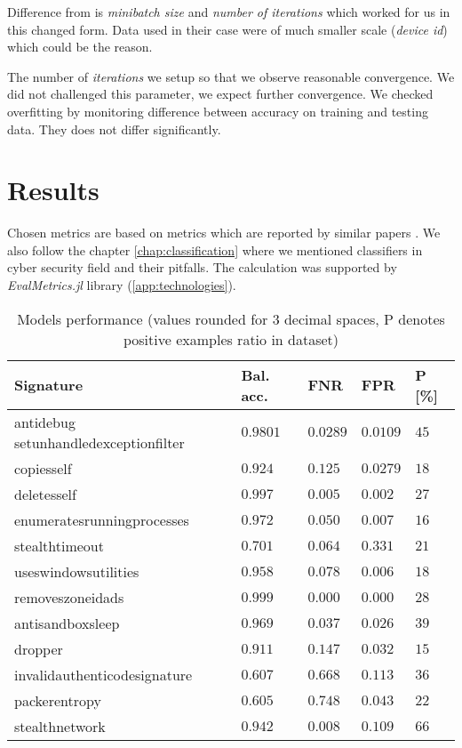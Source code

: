 Difference from \cite{Mandlik2020} is \emph{minibatch size} and \emph{number of iterations} which worked for us in this changed form. Data used in their case were of much smaller scale (\emph{device id}) which could be the reason.

The number of \emph{iterations} we setup so that we observe reasonable convergence. We did not challenged this parameter, we expect further convergence. We checked overfitting by monitoring difference between accuracy on training and testing data. They does not differ significantly.

\section{Results}
Chosen metrics are based on metrics which are reported by similar papers . We also follow the chapter \ref{chap:classification} where we mentioned classifiers in cyber security field and their pitfalls. The calculation was supported by \emph{EvalMetrics.jl} library (\ref{app:technologies}).

\begin{table}[h]
  \centering
  \caption{Models performance (values rounded for 3 decimal spaces, P denotes positive examples ratio in dataset)}
  \begin{tabular}{lllll}
      \toprule
      \textbf{Signature} &
      \textbf{Bal. acc.} &
      \textbf{FNR} &
      \textbf{FPR} &
      \textbf{P [\%]}
      \\
      \midrule
      antidebug setunhandledexceptionfilter & $0.9801$ & $0.0289$ & $0.0109$ & $45$ \\
      \midrule
      copiesself & $0.924$ & $0.125$ & $0.0279$ & $18$ \\
      \midrule
      deletesself & $0.997$ & $0.005$ & $0.002$ & $27$ \\
      \midrule
      enumeratesrunningprocesses & $0.972$ & $0.050$ & $0.007$ & $16$ \\
      \midrule
      stealthtimeout & $0.701$ & $0.064$ & $0.331$ & $21$ \\
      \midrule
      useswindowsutilities & $0.958$ & $0.078$ & $0.006$ & $18$ \\
      \midrule
      removeszoneidads & $0.999$ & $0.000$ & $0.000$ & $28$ \\
      \midrule[0.3pt]
      \midrule[0.3pt]
      antisandboxsleep & $0.969$ & $0.037$ & $0.026$ & $39$ \\
      \midrule
      dropper & $0.911$ & $0.147$ & $0.032$ & $15$ \\
      \midrule
      invalidauthenticodesignature & $0.607$ & $0.668$ & $0.113$ & $36$ \\
      \midrule
      packerentropy & $0.605$ & $0.748$ & $0.043$ & $22$ \\
      \midrule
      stealthnetwork & $0.942$ & $0.008$ & $0.109$ & $66$ \\
      \bottomrule
  \end{tabular}
  \label{tab:models_res}
\end{table}

